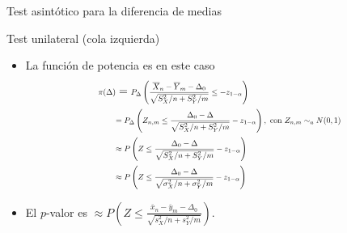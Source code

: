 \documentclass{beamer}
\theoremstyle{definition}
\newcommand\scalemath[2]{\scalebox{#1}{\mbox{\ensuremath{\displaystyle #2}}}}
\begin{document}
\begin{frame}{\color{rosee} Test asint\'otico para la diferencia de medias} \small

\begin{block}{Test unilateral (cola izquierda)}
\begin{itemize}
    \item    La funci\'on de potencia es en este caso
$$
\begin{aligned}
\scalemath{0.7}{\pi(\Delta)} &=\scalemath{0.7}{P_{\Delta}\left(\frac{\overline{X}_{n}-\overline{Y}_{m}-\Delta_0}{\sqrt{S_X^2 / n+S_Y^2 / m}} \leq-z_{1- \alpha}\right)} \\
& \scalemath{0.7}{= P_{\Delta}\left(Z_{n,m}\leq \frac{\Delta_0-\Delta}{\sqrt{S_X^2 / n+S_Y^2 / m}}-z_{1-\alpha}\right), \text{ con } Z_{n,m}\sim_a N(0,1)}\\
& \scalemath{0.7}{\approx P\left(Z\leq \frac{\Delta_0-\Delta}{\sqrt{S_X^2 / n+S_Y^2 / m}}-z_{1-\alpha}\right)}\\
& \scalemath{0.7}{\approx P\left(Z\leq \frac{\Delta_0-\Delta}{\sqrt{\sigma_X^2 / n+\sigma_Y^2 / m}}-z_{1-\alpha}\right)}
\end{aligned}
$$

\item El $p$-valor es
$\approx P\left( Z\leq \frac{\overline{x}_{n}-\overline{y}_{m}-\Delta_0}{\sqrt{s_X^2 /  n+s_Y^2 / m}}\right)$.
\end{itemize}  

\end{block}
\end{frame}
\end{document}
